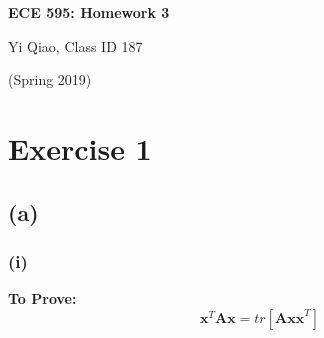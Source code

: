 \documentclass[11pt]{article}
\begin{document}
\begin{center}
\Large{\textbf{ECE 595: Homework 3}}

Yi Qiao, Class ID 187

(Spring 2019)
\end{center}

\section*{Exercise 1}
\subsection*{(a)}
\subsubsection*{(i)}
\noindent \textbf{To Prove:}$$\pmb{x}^T\pmb{Ax}=tr\left[\pmb{Axx}^T\right]$$
\end{document}
